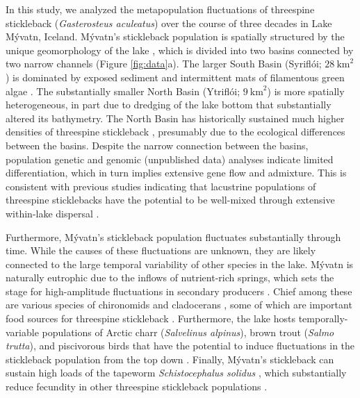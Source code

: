 \documentclass[11pt]{article}
\begin{document}
In this study, 
we analyzed the metapopulation fluctuations of threespine stickleback 
(\textit{Gasterosteus aculeatus})
over the course of three decades in Lake M\'{y}vatn, Iceland.
M\'{y}vatn's stickleback population is spatially structured by the unique geomorphology
of the lake \citep{gislason1998, millet2013}, 
which is divided into two basins connected by two narrow channels 
(Figure \ref{fig:data}a).
The larger South Basin (Sy{\dh}rifl\'{o}i; $28~\text{km}^2$)  
is dominated by exposed sediment and intermittent mats of filamentous green algae
\citep{einarsson2004myvatn}.
The substantially smaller North Basin (Ytrifl\'{o}i; $9~\text{km}^2$) 
is more spatially heterogeneous, 
in part due to dredging of the lake bottom
that substantially altered its bathymetry.
The North Basin has historically sustained much higher
densities of threespine stickleback  \citep{gislason1998}, 
presumably due to the ecological differences between the basins. 
Despite the narrow connection between the basins, 
population genetic \citep{millet2013} 
and genomic (unpublished data) analyses indicate limited differentiation,
which in turn implies extensive gene flow and admixture.
This is consistent with previous studies indicating that lacustrine populations
of threespine sticklebacks have the potential to be  
well-mixed through extensive within-lake dispersal
\citep{bolnick2009phenotype}.

Furthermore, M\'{y}vatn's stickleback population fluctuates substantially through time.
While the causes of these fluctuations are unknown, 
they are likely connected to the large temporal variability 
of other species in the lake.
M\'{y}vatn is naturally eutrophic due to the inflows of nutrient-rich springs,
which sets the stage for high-amplitude fluctuations in secondary producers
\citep{einarsson2004myvatn}.
Chief among these are various species of chironomids and cladocerans
\citep{einarsson2002, einarsson2004clad, gardarsson2004population, ives2008},
some of which are important food sources for threespine stickleback
\citep{gudmundsson1996}.
Furthermore, the lake hosts temporally-variable populations 
of Arctic charr (\textit{Salvelinus alpinus}), 
brown trout (\textit{Salmo trutta}), 
and piscivorous birds that have the potential 
to induce fluctuations in the stickleback population from the top down
\citep{gardarsson1979waterfowl, gudbergsson2004}.
Finally, M\'{y}vatn's stickleback can sustain high loads of the tapeworm
\textit{Schistocephalus solidus} \citep{gislason1998, karvonen2013},
which substantially reduce fecundity 
in other threespine stickleback populations 
\citep{heins2010evolutionary, heins2012fecundity}.
\end{document}
